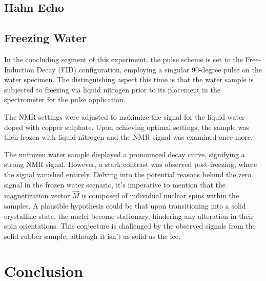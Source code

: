 \documentclass{article}
\begin{document}
\subsection{Hahn Echo}\label{hahn-echo}



\subsection{Freezing Water}\label{freezing-water}
In the concluding segment of this experiment, the pulse scheme is set to the Free-Induction Decay (FID) configuration, employing a singular 90-degree pulse on the water specimen. The distinguishing aspect this time is that the water sample is subjected to freezing via liquid nitrogen prior to its placement in the spectrometer for the pulse application.

The NMR settings were adjusted to maximize the signal for the liquid water doped with copper sulphate. Upon achieving optimal settings, the sample was then frozen with liquid nitrogen and the NMR signal was examined once more.

The unfrozen water sample displayed a pronounced decay curve, signifying a strong NMR signal.
However, a stark contrast was observed post-freezing, where the signal vanished entirely.
Delving into the potential reasons behind the zero signal in the frozen water scenario, it's imperative to mention that the magnetization vector $\vec{M}$ is composed of individual nuclear spins within the samples.
A plausible hypothesis could be that upon transitioning into a solid crystalline state, the nuclei become stationary, hindering any alteration in their spin orientations.
This conjecture is challenged by the observed signals from the solid rubber sample, although it isn't as solid as the ice.


\newpage

\section{Conclusion}\label{sec:conclusion}
\end{document}
